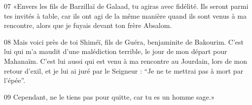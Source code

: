 
07 «Envers les fils de Barzillaï de Galaad, tu agiras avec fidélité. Ils seront parmi tes invités à table, car ils ont agi de la même manière quand ils sont venus à ma rencontre, alors que je fuyais devant ton frère Absalom.

08 Mais voici près de toi Shiméï, fils de Guéra, benjaminite de Bakourim. C’est lui qui m’a maudit d’une malédiction terrible, le jour de mon départ pour Mahanaïm. C’est lui aussi qui est venu à ma rencontre au Jourdain, lors de mon retour d’exil, et je lui ai juré par le Seigneur : “Je ne te mettrai pas à mort par l’épée”.

09 Cependant, ne le tiens pas pour quitte, car tu es un homme sage.»